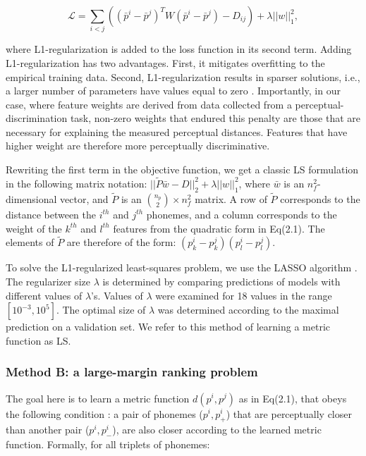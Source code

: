 \begin{equation}
    \mathcal{L} = \sum_{{i} < {j}}{((\bar{p}^i - \bar{p}^j)^TW(\bar{p}^i - \bar{p}^j) - D_{ij})} + \lambda||w||_1^2,
\end{equation}

where L1-regularization is added to the loss function in its second term. Adding L1-regularization has two advantages. First, it mitigates overfitting to the empirical training data. Second, L1-regularization results in sparser solutions, i.e., a larger number of parameters have values equal to zero \citep{Tibshirani1996}. Importantly, in our case, where feature weights are derived from data collected from a perceptual-discrimination task, non-zero weights that endured this penalty are those that are necessary for explaining the measured perceptual distances. Features that have higher weight are therefore more perceptually discriminative. 

Rewriting the first term in the objective function, we get a classic LS formulation in the following matrix notation: $||\widetilde{P}\bar{w} - D||_2^2 + \lambda||w||_1^2$, where $\bar{w}$ is an $n_f^2$-dimensional vector, and $\widetilde{P}$ is an ${n_p \choose 2} \times n_f^2$ matrix. A row of $\widetilde{P}$ corresponds to the distance between the $i^{th}$ and $j^{th}$ phonemes, and a column corresponds to the weight of the $k^{th}$ and $l^{th}$ features from the quadratic form in Eq(2.1). The elements of $\widetilde{P}$ are therefore of the form: $(p_k^i-p_k^j)(p_l^i-p_l^j)$.

To solve the L1-regularized least-squares problem, we use the LASSO algorithm \citep{Tibshirani1996}. The regularizer size $\lambda$ is determined by comparing predictions of models with different values of $\lambda$'s. Values of $\lambda$ were examined for 18 values in the range $[10^{-3}, 10^5]$. The optimal size of $\lambda$ was determined according to the maximal prediction on a validation set. We refer to this method of learning a metric function as LS.

\subsubsection{Method B: a large-margin ranking problem} The goal here is to learn a metric function $d(p^i, p^j)$ as in Eq(2.1), that obeys the following condition \citep{Chechik2010}: a pair of phonemes ($p^i, p^i_+$) that are perceptually closer than another pair ($p^i, p^i_-$), are also closer according to the learned metric function. Formally, for all triplets of phonemes:


